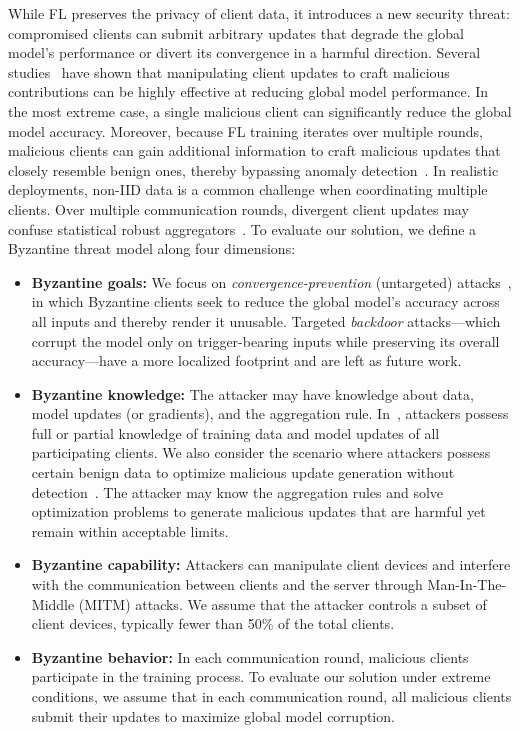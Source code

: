 \documentclass[journal]{IEEEtran}
\begin{document}
While FL preserves the privacy of client data, it introduces a new security threat: compromised clients can submit arbitrary updates that degrade the global model's performance or divert its convergence in a harmful direction. Several studies~\cite{yin2018byzantine, shi2022challenges} have shown that manipulating client updates to craft malicious contributions can be highly effective at reducing global model performance. In the most extreme case, a single malicious client can significantly reduce the global model accuracy. Moreover, because FL training iterates over multiple rounds, malicious clients can gain additional information to craft malicious updates that closely resemble benign ones, thereby bypassing anomaly detection~\cite{baruch2019little}. In realistic deployments, non-IID data is a common challenge when coordinating multiple clients. Over multiple communication rounds, divergent client updates may confuse statistical robust aggregators~\cite{blanchard2017machine, yin2018byzantine}. To evaluate our solution, we define a Byzantine threat model along four dimensions:

\begin{itemize}
    \item \textbf{Byzantine goals:} We focus on \textit{convergence-prevention} (untargeted) attacks~\cite{baruch2019little, shejwalkar2021manipulating}, in which Byzantine clients seek to reduce the global model's accuracy across all inputs and thereby render it unusable. Targeted \textit{backdoor} attacks---which corrupt the model only on trigger-bearing inputs while preserving its overall accuracy---have a more localized footprint and are left as future work.

    \item \textbf{Byzantine knowledge:} The attacker may have knowledge about data, model updates (or gradients), and the aggregation rule. In~\cite{baruch2019little, fang2020local}, attackers possess full or partial knowledge of training data and model updates of all participating clients. We also consider the scenario where attackers possess certain benign data to optimize malicious update generation without detection~\cite{shejwalkar2021manipulating}. The attacker may know the aggregation rules and solve optimization problems to generate malicious updates that are harmful yet remain within acceptable limits.

    \item \textbf{Byzantine capability:} Attackers can manipulate client devices and interfere with the communication between clients and the server through Man-In-The-Middle (MITM) attacks. We assume that the attacker controls a subset of client devices, typically fewer than 50\% of the total clients.

    \item \textbf{Byzantine behavior:} In each communication round, malicious clients participate in the training process. To evaluate our solution under extreme conditions, we assume that in each communication round, all malicious clients submit their updates to maximize global model corruption.
\end{itemize}
\end{document}
